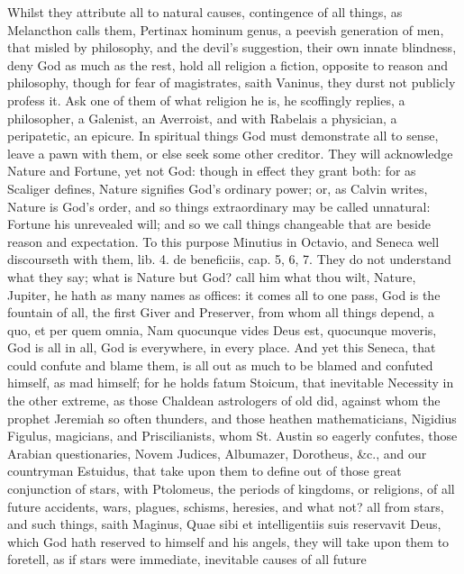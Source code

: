 {Whilst they attribute all to natural causes, contingence of all
things, as Melancthon calls them, Pertinax hominum genus, a peevish
generation of men, that misled by philosophy, and the devil's
suggestion, their own innate blindness, deny God as much as the rest,
hold all religion a fiction, opposite to reason and philosophy, though
for fear of magistrates, saith Vaninus, they durst not publicly
profess it. Ask one of them of what religion he is, he scoffingly
replies, a philosopher, a Galenist, an Averroist, and with
Rabelais a physician, a peripatetic, an epicure. In spiritual things
God must demonstrate all to sense, leave a pawn with them, or else seek
some other creditor. They will acknowledge Nature and Fortune, yet not
God: though in effect they grant both: for as Scaliger defines, Nature
signifies God's ordinary power; or, as Calvin writes, Nature is God's
order, and so things extraordinary may be called unnatural: Fortune his
unrevealed will; and so we call things changeable that are beside
reason and expectation. To this purpose Minutius in Octavio, and
 Seneca well discourseth with them, lib. 4. de beneficiis, cap.
5, 6, 7. They do not understand what they say; what is Nature but God?
call him what thou wilt, Nature, Jupiter, he hath as many names as
offices: it comes all to one pass, God is the fountain of all, the
first Giver and Preserver, from whom all things depend, a quo, et
per quem omnia, Nam quocunque vides Deus est, quocunque moveris, God is
all in all, God is everywhere, in every place. And yet this Seneca,
that could confute and blame them, is all out as much to be blamed and
confuted himself, as mad himself; for he holds fatum Stoicum, that
inevitable Necessity in the other extreme, as those Chaldean
astrologers of old did, against whom the prophet Jeremiah so often
thunders, and those heathen mathematicians, Nigidius Figulus,
magicians, and Priscilianists, whom St. Austin so eagerly confutes,
those Arabian questionaries, Novem Judices, Albumazer, Dorotheus, \&c.,
and our countryman Estuidus, that take upon them to define out of
those great conjunction of stars, with Ptolomeus, the periods of
kingdoms, or religions, of all future accidents, wars, plagues,
schisms, heresies, and what not? all from stars, and such things, saith
Maginus, Quae sibi et intelligentiis suis reservavit Deus, which God
hath reserved to himself and his angels, they will take upon them to
foretell, as if stars were immediate, inevitable causes of all future
}
